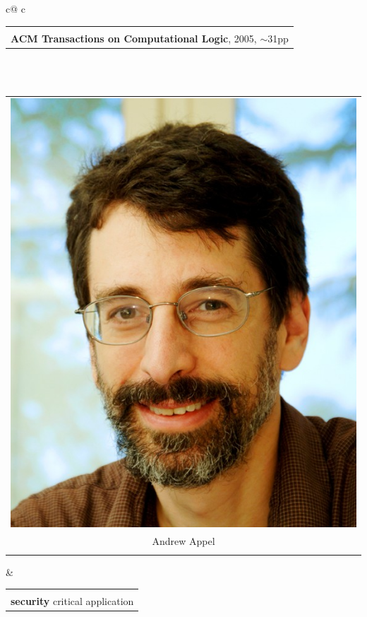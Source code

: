 \documentclass[dvipsnames,14pt,t]{beamer}
\begin{document}
\begin{frame}[c]
\begin{tabular}{c@ {\hspace{2mm}}c}
\begin{tabular}{p{6cm}}
\raggedright
{published a proof on LF in\\ {\bf ACM Transactions on 
 Computational Logic}, 2005,
$\sim$31pp}
\end{tabular}\\

\\[0mm]
  
\begin{tabular}{c}
\includegraphics[scale=0.36]{pics/appel.jpg}\\[-2mm] 
{\footnotesize Andrew Appel}\\[-2.5mm]
{\footnotesize}
\end{tabular} &

\begin{tabular}{p{6cm}}
\raggedright
{relied on their proof in a\\ {\bf security} critical application}
\end{tabular}
\end{tabular}

\end{frame}
\end{document}

